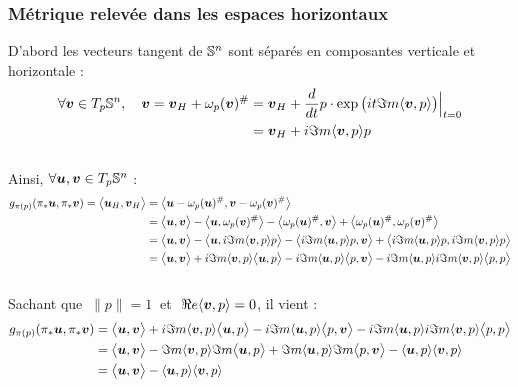 \subsubsection{Métrique relevée dans les espaces horizontaux}

D'abord les vecteurs tangent de $\S{n}$ sont séparés en composantes verticale et horizontale :
\begin{align}
	\forall \bf{v}\in \tg[p]{\S{n}},\quad \bf{v} = \bf{v}_H + \omega_p(\bf{v})^\# &= \bf{v}_H + \frac{d}{dt}p\cdot \exp\big(it\Im m \langle \bf{v}, p \rangle\big)\Big|_{t=0} \\
	&= \bf{v}_H  + i\Im m \langle \bf{v}, p \rangle p
\end{align}
\\
Ainsi, $\forall \bf{u},\bf{v}\in \tg[p]{\S{n}}$ :
\begin{align*}
	g_{\pi(p)}( \pi_*\bf{u}, \pi_*\bf{v}) = \big\langle \bf{u}_H, \bf{v}_H \big\rangle &= \big\langle\bf{u} - \conn_p(\bf{u})^\#, \bf{v} - \conn_p(\bf{v})^\# \big\rangle \\
	&= \big\langle\bf{u}, \bf{v} \big\rangle  - \big\langle\bf{u}, \conn_p(\bf{v})^\# \big\rangle - \big\langle \conn_p(\bf{u})^\#, \bf{v} \big\rangle + \big\langle \conn_p(\bf{u})^\#, \conn_p(\bf{v})^\# \big\rangle \\
	&= \big\langle\bf{u}, \bf{v} \big\rangle  - \big\langle\bf{u},  i\Im m \langle \bf{v}, p \rangle p \big\rangle - \big\langle  i\Im m \langle \bf{u}, p \rangle p, \bf{v} \big\rangle + \big\langle  i\Im m \langle \bf{u}, p \rangle p,  i\Im m \langle \bf{v}, p \rangle p \big\rangle \\
	&= \big\langle\bf{u}, \bf{v} \big\rangle  + i\Im m \langle \bf{v}, p \rangle\big\langle\bf{u}, p \big\rangle - i\Im m \langle \bf{u}, p \rangle\big\langle p, \bf{v} \big\rangle - i\Im m \langle \bf{u}, p \rangle i\Im m \langle \bf{v}, p \rangle \big\langle p, p \big\rangle
\end{align*}
\\
Sachant que $\ \|p\|=1\ $ et $\ \Re e \langle \bf{v},p\rangle = 0$, il vient :
\begin{align*}
	g_{\pi(p)}( \pi_*\bf{u}, \pi_*\bf{v}) 
	&= \big\langle\bf{u}, \bf{v} \big\rangle  + i\Im m \langle \bf{v}, p \rangle\big\langle\bf{u}, p \big\rangle - i\Im m \langle \bf{u}, p \rangle\big\langle p, \bf{v} \big\rangle - i\Im m \langle \bf{u}, p \rangle i\Im m \langle \bf{v}, p \rangle \big\langle p, p \big\rangle \\
	&= \big\langle\bf{u}, \bf{v} \big\rangle  -\Im m \langle \bf{v}, p \rangle \Im m\big\langle\bf{u}, p \big\rangle + \Im m \langle \bf{u}, p \rangle \Im m \big\langle p, \bf{v} \big\rangle - \langle \bf{u}, p \rangle \langle \bf{v}, p \rangle\\
	&= \big\langle\bf{u}, \bf{v} \big\rangle -  \langle \bf{u}, p \rangle \langle \bf{v}, p \rangle
\end{align*}
\\

